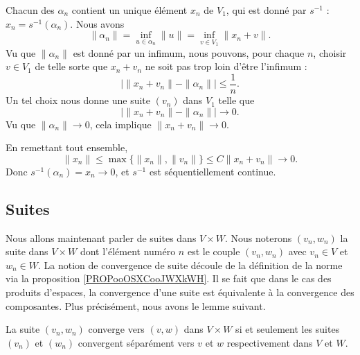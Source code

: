 \begin{normaltext}
	Chacun des \( \alpha_n\) contient un unique élément \( x_n\) de \( V_1\), qui est donné par \( s^{-1}\) : \( x_n= s^{-1}(\alpha_n)\). Nous avons
	\begin{equation}
		\| \alpha_n \|=\inf_{u\in \alpha_n}\| u \|=\inf_{v\in V_1}\| x_n+v \|.
	\end{equation}
	Vu que \( \| \alpha_n \|\) est donné par un infimum, nous pouvons, pour chaque \( n\), choisir \( v\in V_1\) de telle sorte que \( x_n+v_n\) ne soit pas trop loin d'être l'infimum :
	\begin{equation}
		\big| \| x_n+v_n \|-\| \alpha_n \| \big|\leq \frac{1}{ n }.
	\end{equation}
	Un tel choix nous donne une suite \( (v_n)\) dans \( V_1\) telle que
	\begin{equation}
		\big| \| x_n+v_n \|-\| \alpha_n \| \big|\to 0.
	\end{equation}
	Vu que \( \| \alpha_n \|\to 0\), cela implique \( \| x_n+v_n \|\to 0\).

	En remettant tout ensemble,
	\begin{equation}
		\| x_n \|\leq \max\{ \| x_n \|,\| v_n \| \}\leq C\| x_n+v_n \|\to 0.
	\end{equation}
	Donc \( s^{-1}(\alpha_n)=x_n\to 0\), et \( s^{-1}\) est séquentiellement continue.
\end{normaltext}

\subsection{Suites}

Nous allons maintenant parler de suites dans \( V\times W\). Nous noterons \( (v_n,w_n)\) la suite dans \( V\times W\) dont l'élément numéro \( n\) est le couple \( (v_n,w_n)\) avec \( v_n\in V\) et \( w_n\in W\). La notion de convergence de suite découle de la définition de la norme via la proposition \ref{PROPooOSXCooJWXkWH}. Il se fait que dans le cas des produits d'espaces, la convergence d'une suite est équivalente à la convergence des composantes. Plus précisément, nous avons le lemme suivant.
\begin{lemma}       \label{LemCvVxWcvVW}
	La suite \( (v_n,w_n)\) converge vers \( (v,w)\) dans \( V\times W\) si et seulement les suites \( (v_n)\) et \( (w_n)\) convergent séparément vers \( v\) et \( w\) respectivement dans \( V\) et \( W\).
\end{lemma}

